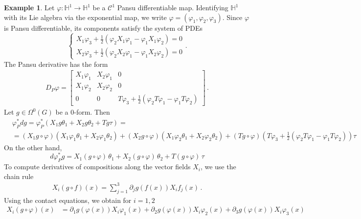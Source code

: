 \documentclass[dvipsnames]{amsart}
\theoremstyle{definition}
\newtheorem{example}[theorem]{Example}
\theoremstyle{definition}
\numberwithin{equation}{section}
\begin{document}
\begin{example}
    Let $\varphi : \mathbb{H}^1 \rightarrow \mathbb{H}^1$ be a $\mathcal{C}^1$ Pansu differentiable map. Identifying $\mathbb{H}^1$ with its Lie algebra via the exponential map, we write $\varphi = (\varphi_1, \varphi_2, \varphi_3)$. 
    Since $\varphi$ is Pansu differentiable, its components satisfy the system of PDEs
    \begin{equation*}
\begin{cases}
    X_1\varphi_3 + \frac{1}{2}(\varphi_2 X_1\varphi_1 - \varphi_1 X_1\varphi_2) = 0 \\
    X_2\varphi_3 + \frac{1}{2}(\varphi_2 X_2\varphi_1 - \varphi_1 X_2\varphi_2) = 0
\end{cases}.
\end{equation*}
    The Pansu derivative  has the form
\begin{align*}
D_P\varphi=\begin{bmatrix}
            X_1\varphi_1 & X_2\varphi_1 & 0\\
        X_1\varphi_2 & X_2\varphi_2 & 0 \\ 0 & 0 & T\varphi_3 + \frac{1}{2}(\varphi_2 T\varphi_1 - \varphi_1 T\varphi_2)\end{bmatrix}\,.
    \end{align*}
Let $g\in \Omega^0(G)$ be a $0$-form. Then
    \begin{align*}
        &\varphi_P^* dg = \varphi_P^* (X_1g \theta_1 + X_2g \theta_2 + Tg \tau) =\\ 
        &=(X_1g \circ \varphi)(X_1\varphi_1 \theta_1 + X_2\varphi_1 \theta_2) + (X_2g \circ \varphi) (X_1\varphi_2 \theta_1 + X_2\varphi_2 \theta_2) + (Tg \circ \varphi) \left(T\varphi_3 + \frac{1}{2}(\varphi_2 T\varphi_1 - \varphi_1 T\varphi_2)\right)\tau
    \end{align*}
    On the other hand, 
    \begin{equation*}
        d\varphi_P^* g = X_1(g \circ \varphi) \,\theta_1 + X_2(g \circ \varphi) \,\theta_2 + T(g \circ \varphi)\, \tau
    \end{equation*}
    To compute derivatives of compositions along the vector fields $X_i$, we use the chain rule
    \begin{align*}
    X_i(g\circ f)(x)=\sum_{j=1}^3\partial_jg(f(x)) X_if_j(x)\,.
\end{align*}
Using the contact equations, we obtain for $i=1,2$
\begin{align*}
    X_i(g \circ \varphi)(x) &= \partial_1g(\varphi(x)) X_i\varphi_1(x)+\partial_2g(\varphi(x)) X_i\varphi_2(x)+\partial_3g(\varphi(x)) X_i\varphi_3(x)\\ 

\end{align*}
\end{example}
\end{document}
